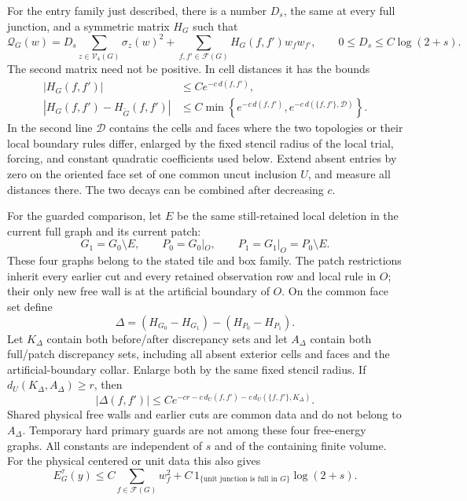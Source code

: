 \begin{lemma}\label{ent:face-localization}
For the entry family just described, there is a number \(D_s\),
the same at every full junction,
and a symmetric matrix \(H_G\) such that
\begin{equation}\label{ent:face-decomposition}
 \mathcal Q_G(w)=D_s\sum_{z\in\mathcal V_4(G)}\sigma_z(w)^2
             +\sum_{f,f'\in\mathcal F(G)}H_G(f,f')w_fw_{f'},
 \qquad 0\le D_s\le C\log(2+s).
\end{equation}
The second matrix need not be positive.  In cell distances it has
the bounds
\begin{equation}\label{ent:face-matrix-bounds}
\begin{split}
 |H_G(f,f')|&\le Ce^{-c\,d(f,f')},\\
 |H_G(f,f')-H_{\widetilde G}(f,f')|
 &\le C\min\left\{
       e^{-c\,d(f,f')},
       e^{-c\,d(\{f,f'\},\mathcal D)}
                    \right\}.
\end{split}
\end{equation}
In the second line \(\mathcal D\) contains the cells and faces where
the two topologies or their local boundary rules differ, enlarged by
the fixed stencil radius of the local trial, forcing, and constant
quadratic coefficients used below.  Extend absent entries by zero
on the oriented face set of one common uncut inclusion \(U\), and
measure all distances there.  The two decays can be combined after
decreasing \(c\).

For the guarded comparison, let \(E\) be the same still-retained
local deletion in the current full graph and its current patch:
\[
 G_1=G_0\setminus E,\qquad
 P_0=G_0|_O,\qquad P_1=G_1|_O=P_0\setminus E.
\]
These four graphs belong to the stated tile and box family.  The
patch restrictions inherit every earlier cut and every retained
observation row and local rule in \(O\); their only new free wall is at the artificial boundary
of \(O\).  On the common face set define
\[
 \Delta=(H_{G_0}-H_{G_1})-(H_{P_0}-H_{P_1}).
\]
Let \(K_\Delta\) contain both before/after discrepancy sets and let
\(A_\Delta\) contain both full/patch discrepancy sets, including
all absent exterior cells and faces and the artificial-boundary
collar.  Enlarge both by the same fixed stencil radius.  If
\(d_U(K_\Delta,A_\Delta)\ge r\), then
\begin{equation}\label{ent:guarded-face-error}
 |\Delta(f,f')|
 \le C e^{-cr-c\,d_U(f,f')-c\,d_U(\{f,f'\},K_\Delta)}.
\end{equation}
Shared physical free walls and earlier cuts are common data and do
not belong to \(A_\Delta\).  Temporary hard primary guards are not
among these four free-energy graphs.
All constants are independent of \(s\) and of the containing
finite volume.  For the physical centered or unit data this also
gives
\begin{equation}\label{ent:face-energy-upper}
 E_G^\tau(y)\le C\sum_{f\in\mathcal F(G)}w_f^2
       +C\,1_{\{\text{unit junction is full in }G\}}\log(2+s).
\end{equation}
\end{lemma}

